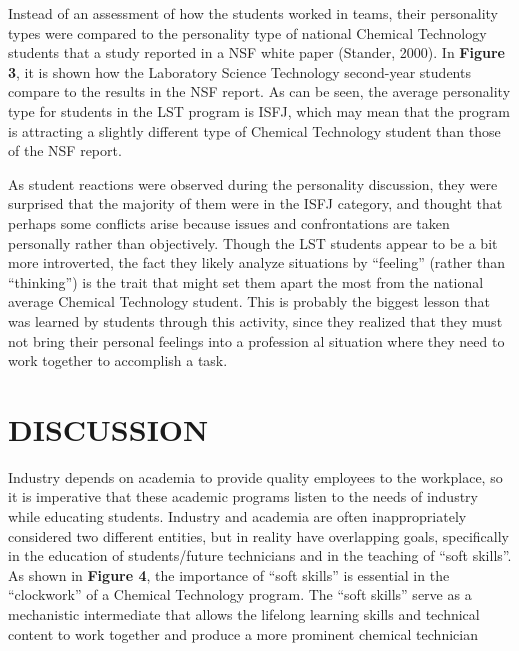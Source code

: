 \documentclass[11.5pt]{sig-alternate} %
\begin{document}
\begin{large}
Instead of an assessment of how the students worked in teams, their personality types were compared to the personality type of national Chemical Technology students that a study reported in a NSF white paper (Stander, 2000). In \textbf{Figure 3}, it is shown how the Laboratory Science Technology second-year students compare to the results in the NSF report. As can be seen, the average personality type for students in the LST program is ISFJ, which may mean that the program is attracting a slightly different type of Chemical Technology student than those of the NSF report.


As student reactions were observed during the personality discussion, they were surprised that the majority of them were in the ISFJ category, and thought that perhaps some conflicts arise because issues and confrontations are taken personally rather than objectively. Though the LST students appear to be a bit more introverted, the fact they likely analyze situations by “feeling” (rather than “thinking”) is the trait that might set them apart the most from the national average Chemical Technology student. This is probably the biggest lesson that was learned by students through this activity, since they realized that they must not bring their personal feelings into a profession al situation where they need to work together to accomplish a task.

\section*{DISCUSSION}

Industry depends on academia to provide quality employees to the workplace, so it is imperative that these academic programs listen to the needs of industry while educating students. Industry and academia are often inappropriately considered two different entities, but in reality have overlapping goals, specifically in the education of students/future technicians and in the teaching of “soft skills”. As shown in \textbf{Figure 4}, the importance of “soft skills” is essential in the “clockwork” of a Chemical Technology program. The “soft skills” serve as a mechanistic intermediate that allows the lifelong learning skills and technical content to work together and produce a more prominent chemical technician \\


\end{large}
\end{document}
